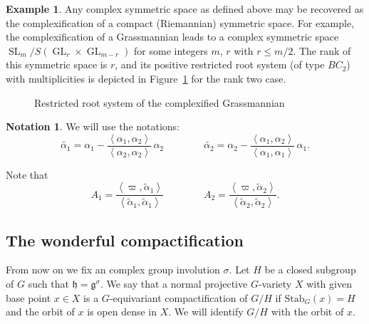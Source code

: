 \documentclass[JEP,XML,SOM,Unicode, NoEqCountersInSection, NoFloatCountersInSection]{cedram}
\theoremstyle{plain}
\theoremstyle{definition}
\newtheorem{exa}[thm]{Example}
\newtheorem{nota}[thm]{Notation}
\DeclareMathOperator{\SL}{SL}
\DeclareMathOperator{\GL}{GL}
\begin{document}
\begin{exa}
Any complex symmetric space as defined above may be recovered as the complexification
of a compact (Riemannian) symmetric space. For example, the complexification of a
Grassmannian leads to a complex symmetric space
$\SL_m/S(\GL_r\times \GL_{m-r})$ for some integers $m$, $r$ with $r\leq m/2$.
The rank of this symmetric space is $r$,
and its positive restricted root system (of type $BC_2$) with multiplicities is depicted
in Figure~\ref{fig:AIII} for the rank two case.
\begin{figure}
\smaller \smaller\centering
{}
\caption{Restricted root system of the complexified Grassmannian}
\label{fig:AIII}
\end{figure}
\end{exa}

\begin{nota}
We will use the notations:
\[ \tilde{\alpha_1} = \alpha_1 - \frac{\left<\alpha_1,\alpha_2\right>}{\left<\alpha_2,\alpha_2\right>}\,\alpha_2
\qquad \qquad
\tilde{\alpha_2}= \alpha_2 - \frac{\left<\alpha_1,\alpha_2\right>}{\left<\alpha_1,\alpha_1\right>}\,\alpha_1. \]
\end{nota}

Note that
\[ A_1=\frac{\left<\varpi,\tilde{\alpha}_1\right>}{\left<\tilde{\alpha}_1,\tilde{\alpha}_1\right>}
\qquad \qquad
A_2=\frac{\left<\varpi,\tilde{\alpha}_2\right>}{\left<\tilde{\alpha}_2,\tilde{\alpha}_2\right>}. \]

\subsection{The wonderful compactification}

From now on we fix an complex group involution $\sigma$.
Let $H$ be a closed subgroup of $G$ such that $\mathfrak{h}=\mathfrak{g}^{\sigma}$.
We say that a normal projective $G$-variety $X$ with given base point $x\in X$ is
a $G$-equivariant compactification of $G/H$ if $\mathrm{Stab}_G(x)=H$ and the orbit
of $x$ is open dense in $X$.
We will identify $G/H$ with the orbit of $x$.
\end{document}
